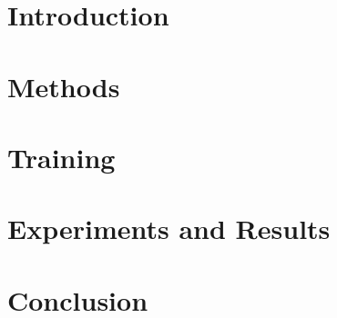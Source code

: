 \documentclass[a4paper,12pt,headsepline, fleqn, english]{scrartcl}%
\begin{document}
	
	
	
	\newpage
	
	
	
	\newpage
	
	\setcounter{page}{1}
	
	\thispagestyle{empty}
	\tableofcontents
	
	\newpage
	
	
	\section{Introduction}

	
	

	\section{Methods}
	
	

	\section{Training}
	
	

	\section{Experiments and Results}

	
	
	
	\section{Conclusion}
	
	

	\newpage	
	
	\printbibliography
\end{document}
